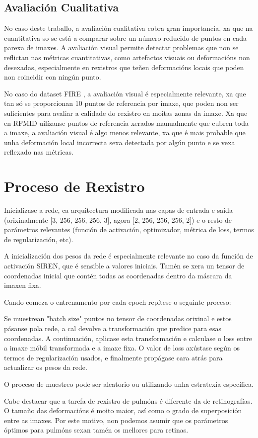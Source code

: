 \subsection{Avaliación Cualitativa}
\label{subsec:Avaliación Cualitativa}

No caso deste traballo, a avaliación cualitativa cobra gran importancia, xa que na cuantitativa so se está a comparar sobre un número reducido de puntos en cada parexa de imaxes.
A avaliación visual permite detectar problemas que non se reflictan nas métricas cuantitativas, como artefactos visuais ou deformacións non desexadas, 
especialmente en rexistros que teñen deformacións locais que poden non coincidir con ningún punto.

No caso do dataset FIRE \cite{FIRE}, a avaliación visual é especialmente relevante, xa que tan só se proporcionan 10 puntos de referencia por imaxe, que poden non ser suficientes para avaliar a calidade do rexistro en moitas zonas da imaxe.
Xa que en RFMID \cite{RFMiD} uilízanse puntos de referencia xerados manualmente que cubren toda a imaxe, a avaliación visual é algo menos relevante, xa que é mais probable que unha deformación local incorrecta sexa detectada por algún punto e se vexa reflexado nas métricas.

\section{Proceso de Rexistro}
\label{sec:Proceso de Rexistro}

Inicializase a rede, ca arquitectura modificada nas capas de entrada e saída 
(orixinalmente [3, 256, 256, 256, 3], agora [2, 256, 256, 256, 2]) 
e o resto de parámetros relevantes (función de activación, optimizador, métrica de loss, termos de regularización, etc).

A inicialización dos pesos da rede é especialmente relevante no caso da función de activación SIREN, que é sensible a valores iniciais.
Tamén se xera un tensor de coordenadas inicial que contén todas as coordenadas dentro da máscara da imaxen fixa.

Cando comeza o entrenamento por cada epoch repítese o seguinte proceso:

Se muestrean "batch size" puntos no tensor de coordenadas orixinal e estos pásanse pola rede, 
a cal devolve a transformación que predice para esas coordenadas.
A continuación, aplicase esta transformación e calculase o loss entre a imaxe móbil transformada e a imaxe fixa.
O valor de loss axústase según os termos de regularización usados, e finalmente propágase cara atrás para actualizar os pesos da rede.

O proceso de muestreo pode ser aleatorio ou utilizando unha estratexia específica.

Cabe destacar que a tarefa de rexistro de pulmóns é diferente da de retinografías. O tamaño das deformacións é moito maior, así como o grado de superposición entre as imaxes.
Por este motivo, non podemos asumir que os parámetros óptimos para pulmóns sexan tamén os mellores para retinas.